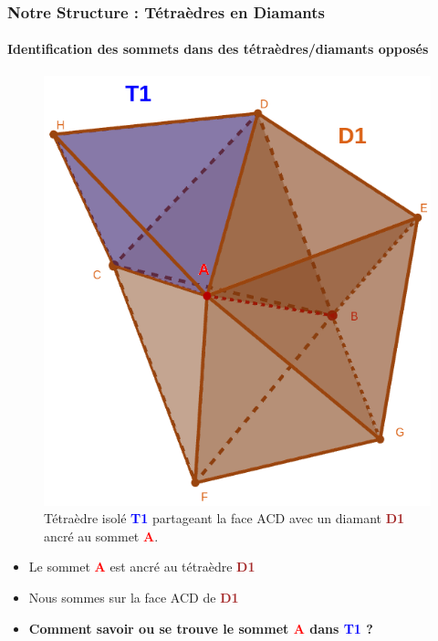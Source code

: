 \documentclass[9pt]{beamer}
\begin{document}
\begin{frame}
\frametitle{Notre Structure : Tétraèdres en Diamants}
\framesubtitle{Identification des sommets dans des tétraèdres/diamants opposés}
\begin{figure}[H]
\centering
\includegraphics[scale=0.21]{Images/permut1}
\caption{Tétraèdre isolé \textcolor{blue}{\textbf{T1}} partageant la face ACD avec un diamant \textcolor{brown}{\textbf{D1}} ancré au sommet \textcolor{red}{\textbf{A}}.}
\end{figure}
\begin{block}{}
\begin{itemize}
\item Le sommet \textcolor{red}{\textbf{A}} est ancré au tétraèdre \textcolor{brown}{\textbf{D1}}
\item Nous sommes sur la face ACD de \textcolor{brown}{\textbf{D1}}
\item\textbf{Comment savoir ou se trouve le sommet \textcolor{red}{\textbf{A}} dans \textcolor{blue}{\textbf{T1}} ?}
\end{itemize}
\end{block}
\end{frame}
\end{document}
